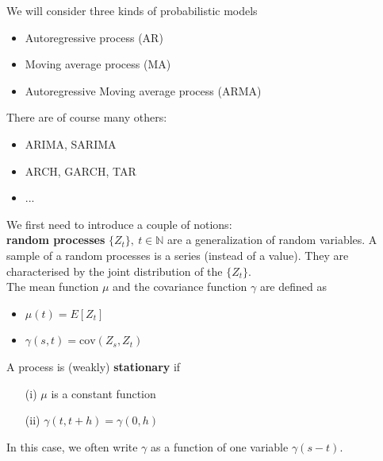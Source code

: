 \documentclass{beamer}
\begin{document}
\begin{frame}{}
We will consider three kinds of probabilistic models
\vspace{2mm}
\begin{itemize}
	\item Autoregressive process (AR) \vspace{2mm}
	\item Moving average process (MA) \vspace{2mm} 
	\item Autoregressive Moving average process (ARMA)
\end{itemize} 
\vspace{5mm}
There are of course many others:
\vspace{2mm}
\begin{itemize}
	\item ARIMA, SARIMA \vspace{2mm}
	\item ARCH, GARCH, TAR
	\item ...
\end{itemize} 
\end{frame}

\begin{frame}{}
We first need to introduce a couple of notions:\\
\vspace{2mm}
\textbf{random processes} $\{ Z_t \},\ t \in \mathds{N}$ are a generalization of random variables. A sample of a random processes is a series (instead of a value). They are characterised by the joint distribution of the $\{ Z_t \}$.\\
\vspace{2mm}
The mean function $\mu$ and the covariance function $\gamma$ are defined as
\begin{itemize}
 	\item $\mu(t) = E[Z_t]$
 	\item $\gamma(s,t) = \mathrm{cov}(Z_s,Z_t)$
 \end{itemize} 
\vspace{2mm}
A process is (weakly) \textbf{stationary} if 
\begin{itemize}
	\item[(i)] $\mu$ is a constant function
	\item[(ii)] $\gamma(t,t+h) = \gamma(0,h) $
\end{itemize}
In this case, we often write $\gamma$ as a function of one variable $\gamma(s-t)$.

\end{frame}
\end{document}
